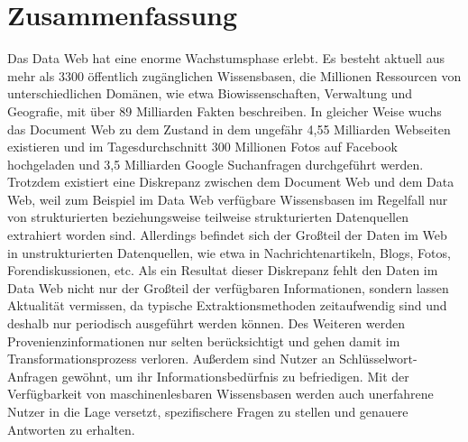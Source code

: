 \chapter*{Zusammenfassung}
Das Data Web hat eine enorme Wachstumsphase erlebt.
Es besteht aktuell aus mehr als 3300 öffentlich zugänglichen Wissensbasen, die Millionen Ressourcen von unterschiedlichen Domänen, wie etwa Biowissenschaften, Verwaltung und Geografie, mit über 89 Milliarden Fakten beschreiben. 
In gleicher Weise wuchs das Document Web zu dem Zustand in dem ungefähr 4,55 Milliarden Webseiten existieren und im Tagesdurchschnitt 300 Millionen Fotos auf Facebook hochgeladen und 3,5 Milliarden Google Suchanfragen durchgeführt werden.
Trotzdem existiert eine Diskrepanz zwischen dem Document Web und dem Data Web, weil zum Beispiel im Data Web verfügbare Wissensbasen im Regelfall nur von strukturierten beziehungsweise teilweise strukturierten Datenquellen extrahiert worden sind. 
Allerdings befindet sich der Großteil der Daten im Web in unstrukturierten Datenquellen, wie etwa in Nachrichtenartikeln, Blogs, Fotos, Forendiskussionen, etc.
Als ein Resultat dieser Diskrepanz fehlt den Daten im Data Web nicht nur der Großteil der verfügbaren Informationen, sondern lassen Aktualität vermissen, da typische Extraktionsmethoden zeitaufwendig sind und deshalb nur periodisch ausgeführt werden können. 
Des Weiteren werden Provenienzinformationen nur selten berücksichtigt und gehen damit im Transformationsprozess verloren.
Außerdem sind Nutzer an Schlüsselwort-Anfragen gewöhnt, um ihr Informationsbedürfnis zu befriedigen.
Mit der Verfügbarkeit von maschinenlesbaren Wissensbasen werden auch unerfahrene Nutzer in die Lage versetzt, spezifischere Fragen zu stellen und genauere Antworten zu erhalten.

